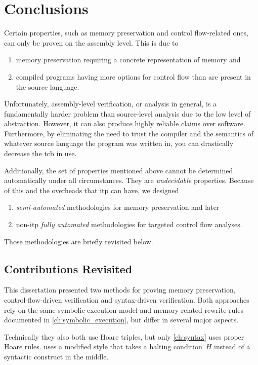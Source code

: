 \chapter{Conclusions}\label{ch:conclusions}
Certain properties, such as memory preservation and control flow-related ones, can only be proven on the assembly level.
This is due to
\begin{enumerate}
  \item memory preservation requiring a concrete representation of memory and
  \item compiled programs having more options for control flow than are present in the source language.
\end{enumerate}
Unfortunately, assembly-level verification, or analysis in general, is a fundamentally harder problem than source-level analysis due to the low level of abstraction.
However, it can also produce highly reliable claims over software.
Furthermore, by eliminating the need to trust the compiler and the semantics of whatever source language the program was written in, you can drastically decrease the \ac{tcb} in use.

Additionally, the set of properties mentioned above cannot be determined automatically under all circumstances. They are \emph{undecidable} properties.
Because of this and the overheads that \ac{itp} can have, we designed
\begin{enumerate}
  \item \emph{semi-automated} methodologies for memory preservation and later
  \item non-\ac{itp} \emph{fully automated} methodologies for targeted control flow analyses.
\end{enumerate}
Those methodologies are briefly revisited below.

\section{Contributions Revisited}
This dissertation presented two methods for proving memory preservation,
control-flow-driven verification and syntax-driven verification.
Both approaches rely on the same symbolic execution model and memory-related rewrite rules documented in \cref{ch:symbolic_execution}, but differ in several major aspects.
\begin{remark}
  Technically they also both use Hoare triples, but only \cref{ch:syntax} uses proper Hoare rules.
   uses a modified style that takes a halting condition~$H$ instead of a syntactic construct in the middle.
\end{remark}

